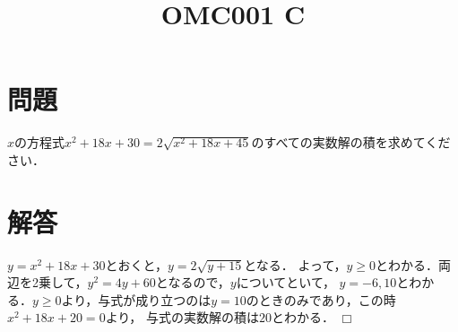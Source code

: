 \documentclass[uplatex,dvipdfmx,a4paper]{jsarticle}
\title{OMC001 C}
\date{}
\author{}
\def\qed{\hfill $\Box$}
\newenvironment{problem}{\section*{問題}}{}
\newenvironment{solution}{\section*{解答}}{\qed}
\begin{document}
\maketitle
\begin{problem}
    $x$の方程式$x^2+18x+30=2\sqrt{x^2+18x+45}$のすべての実数解の積を求めてください．
\end{problem}

\begin{solution}
    $y=x^2+18x+30$とおくと，$y=2\sqrt{y+15}$となる．
    よって，$y\ge0$とわかる．両辺を2乗して，$y^2=4y+60$となるので，$y$についてといて，
    $y=-6, 10$とわかる．$y\ge0$より，与式が成り立つのは$y=10$のときのみであり，この時$x^2+18x+20=0$より，
    与式の実数解の積は$20$とわかる．
\end{solution}
\end{document}
